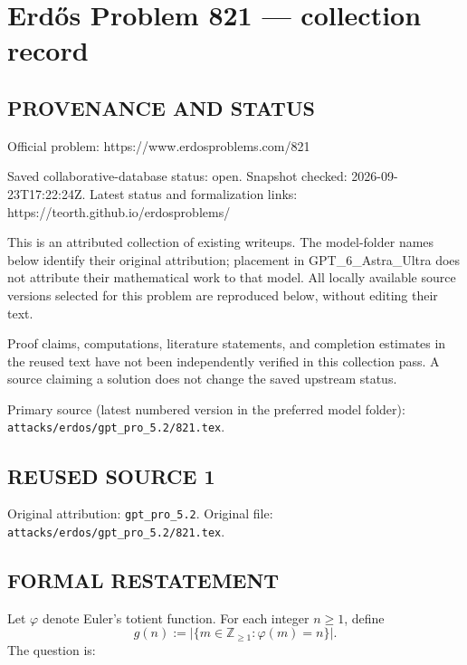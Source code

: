 \section*{Erd\H{o}s Problem 821 --- collection record}

\subsection*{PROVENANCE AND STATUS}
Official problem: https://www.erdosproblems.com/821

Saved collaborative-database status: open.
Snapshot checked: 2026-09-23T17:22:24Z.
Latest status and formalization links: https://teorth.github.io/erdosproblems/

This is an attributed collection of existing writeups. The model-folder names below identify their original attribution; placement in GPT\_6\_Astra\_Ultra does not attribute their mathematical work to that model. All locally available source versions selected for this problem are reproduced below, without editing their text.

Proof claims, computations, literature statements, and completion estimates in the reused text have not been independently verified in this collection pass. A source claiming a solution does not change the saved upstream status.

Primary source (latest numbered version in the preferred model folder): \texttt{attacks/erdos/gpt\_pro\_5.2/821.tex}.

\subsection*{REUSED SOURCE 1}
Original attribution: \texttt{gpt\_pro\_5.2}.
Original file: \texttt{attacks/erdos/gpt\_pro\_5.2/821.tex}.



\subsection*{FORMAL RESTATEMENT}
Let $\varphi$ denote Euler's totient function. For each integer $n\ge 1$, define
\[
 g(n) := \bigl|\{m\in\mathbb{Z}_{\ge 1} : \varphi(m)=n\}\bigr|.
\]
The question is:

